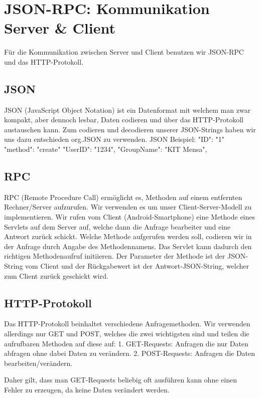 
\section{JSON-RPC: Kommunikation Server \& Client}
Für die Kommunikation zwischen Server und Client benutzen wir JSON-RPC und das HTTP-Protokoll.

\subsection{JSON}
JSON (JavaScript Object Notation) ist ein Datenformat mit welchem man zwar kompakt, aber dennoch lesbar, Daten codieren und über das HTTP-Protokoll austauschen kann.
Zum codieren und decodieren unserer JSON-Strings haben wir uns dazu entschieden org.JSON zu verwenden.
JSON Beispiel:
{
  "ID": "1"
  "method": "create"	
  "UserID": "1234",
  "GroupName": "KIT Mensa",
}

\subsection{RPC}
RPC (Remote Procedure Call) ermöglicht es, Methoden auf einem entfernten Rechner/Server aufzurufen. Wir verwenden es um unser Client-Server-Modell zu implementieren.
Wir rufen vom Client (Android-Smartphone) eine Methode eines Servlets auf dem Server auf, welche dann die Anfrage bearbeiter und eine Antwort zurück schickt.
Welche Methode aufgerufen werden soll, codieren wir in der Anfrage durch Angabe des Methodennamens. Das Servlet kann dadurch den richtigen Methodenaufruf initiieren.
Der Parameter der Methode ist der JSON-String vom Client und der Rückgabewert ist der Antwort-JSON-String, welcher zum Client zurück geschickt wird.


\subsection{HTTP-Protokoll}
Das HTTP-Protokoll beinhaltet verschiedene Anfragemethoden.
Wir verwenden allerdings nur GET und POST, welches die zwei wichtigsten sind und teilen die aufrufbaren Methoden auf diese auf:
1. GET-Requests: Anfragen die nur Daten abfragen ohne dabei Daten zu verändern.
2. POST-Requests: Anfragen die Daten bearbeiten/verändern.

Daher gilt, dass man GET-Requests beliebig oft ausführen kann ohne einen Fehler zu erzeugen, da keine Daten verändert werden.
\newpage
\hypertarget{controler.serverConnection}{}
\hypertarget{ServerConnection}{}

